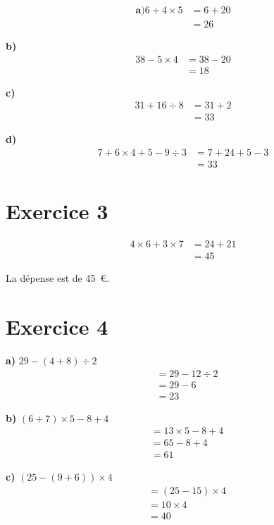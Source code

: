 \documentclass[12pt]{extarticle}
\begin{document}
\begin{align*}
\textbf{a)}
6 + 4 \times 5 &= 6 + 20 \\
               &= 26
\end{align*}

\textbf{b)}
\begin{align*}
38 - 5 \times 4 &= 38 - 20 \\
                &= 18
\end{align*}

\textbf{c)}
\begin{align*}
31 + 16 \div 8 &= 31 + 2 \\
               &= 33
\end{align*}

\textbf{d)}
\begin{align*}
7 + 6 \times 4 + 5 - 9 \div 3 &= 7 + 24 + 5 - 3 \\
                              &= 33
\end{align*}

\section*{Exercice 3}
\begin{align*}
4 \times 6 + 3 \times 7 &= 24 + 21 \\
                        &= 45
\end{align*}

La dépense est de 45~€.

\section*{Exercice 4}

\textbf{a)} $29 - (4 + 8) \div 2$
\begin{align*}
&= 29 - 12 \div 2 \\
&= 29 - 6 \\
&= 23
\end{align*}

\textbf{b)} $(6 + 7) \times 5 - 8 + 4$
\begin{align*}
&= 13 \times 5 - 8 + 4 \\
&= 65 - 8 + 4 \\
&= 61
\end{align*}

\textbf{c)} $(25 - (9 + 6)) \times 4$
\begin{align*}
&= (25 - 15) \times 4 \\
&= 10 \times 4 \\
&= 40
\end{align*}
\end{document}
